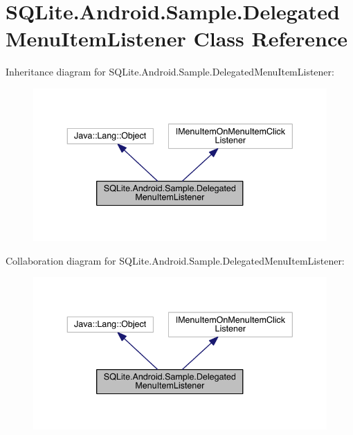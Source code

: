 \hypertarget{class_s_q_lite_1_1_android_1_1_sample_1_1_delegated_menu_item_listener}{\section{S\+Q\+Lite.\+Android.\+Sample.\+Delegated\+Menu\+Item\+Listener Class Reference}
\label{class_s_q_lite_1_1_android_1_1_sample_1_1_delegated_menu_item_listener}
}


Inheritance diagram for S\+Q\+Lite.\+Android.\+Sample.\+Delegated\+Menu\+Item\+Listener\+:
\nopagebreak
\begin{figure}[H]
\begin{center}
\leavevmode
\includegraphics[width=339pt]{class_s_q_lite_1_1_android_1_1_sample_1_1_delegated_menu_item_listener__inherit__graph}
\end{center}
\end{figure}


Collaboration diagram for S\+Q\+Lite.\+Android.\+Sample.\+Delegated\+Menu\+Item\+Listener\+:
\nopagebreak
\begin{figure}[H]
\begin{center}
\leavevmode
\includegraphics[width=339pt]{class_s_q_lite_1_1_android_1_1_sample_1_1_delegated_menu_item_listener__coll__graph}
\end{center}
\end{figure}
